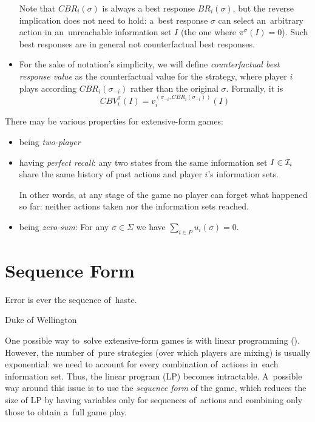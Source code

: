 \begin{itemize}
    Note that $CBR _i (\sigma)$ is always a best response $BR _i (\sigma)$, but the reverse implication does not need to hold:
    a~best response $\sigma$ can select an~arbitrary action in an~unreachable information set $I$ (the one where $\pi ^\sigma (I) = 0$).
    Such best responses are in general not counterfactual best responses.

  \item For the sake of notation's simplicity, we will define \emph{counterfactual best response value} as the counterfactual value for the strategy, where player $i$ plays according $CBR _i (\sigma _{-i})$ rather than the original $\sigma$.
    Formally, it is
    \[ CBV _i ^\sigma (I) = v _i ^{(\sigma _{-i}, CBR _i (\sigma _{-i} ))} (I) \]

\end{itemize}

There may be various properties for extensive-form games:

\begin{itemize}
  \item being \emph{two-player}
  \item having \emph{perfect recall}: any two states from the same information set $I \in \mathcal{I} _i$ share the same history of past actions and player $i$'s information sets.

    In other words, at any stage of the game no player can forget what happened so far:
    neither actions taken nor the information sets reached.
  \item being \emph{zero-sum}: For any $\sigma \in \Sigma$ we have $\sum _{i \in P} u _i (\sigma) = 0$.
\end{itemize}

\section{Sequence Form}
{
  \setlength{\epigraphwidth}{0.65\textwidth}
  \epigraph{
    Error is ever the sequence of~haste.
  }{Duke of Wellington}
}%
One possible way to~solve extensive-form games is with linear programming (\cite[pp.~73--74]{AGT07}).
However, the number of~pure strategies (over which players are mixing) is usually exponential:
we need to account for every combination of~actions in~each information set.
Thus, the linear program (LP) becomes intractable.
A~possible way around this issue is to use the \emph{sequence form} of the game, which reduces the size of LP by having variables only for sequences of~actions and combining only those to obtain a~full game play.

